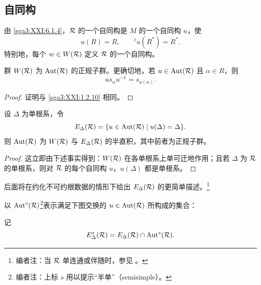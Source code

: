 \subsection{自同构}\label{sga3:XXI:6.7}

由 \ref{sga3:XXI:6.1.4}，\(\mathcal{R}\) 的一个自同构是 \(M\) 的一个自同构 \(u\)，使
\[
 u(R)=R,
 \qquad
 {}^tu(R^\ast)=R^\ast.
\]
特别地，每个 \(w\in W(\mathcal{R})\) 定义 \(\mathcal{R}\) 的一个自同构。

\begin{lemma}\label{sga3:XXI:6.7.1}
群 \(W(\mathcal{R})\) 为 \(\operatorname{Aut}(\mathcal{R})\) 的正规子群。更确切地，若 \(u\in\operatorname{Aut}(\mathcal{R})\) 且 \(\alpha\in R\)，则
\[
 us_\alpha u^{-1}=s_{u(\alpha)}.
\]
\end{lemma}

\begin{proof}
证明与 \ref{sga3:XXI:1.2.10} 相同。
\end{proof}

\begin{proposition}\label{sga3:XXI:6.7.2}
设 \(\Delta\) 为单根系，令
\[
 E_\Delta(\mathcal{R})=
 \{u\in\operatorname{Aut}(\mathcal{R})\mid u(\Delta)=\Delta\}.
\]
则 \(\operatorname{Aut}(\mathcal{R})\) 为 \(W(\mathcal{R})\) 与 \(E_\Delta(\mathcal{R})\) 的半直积，其中前者为正规子群。
\end{proposition}

\begin{proof}
这立即由下述事实得到：\(W(\mathcal{R})\) 在各单根系上单可迁地作用；且若 \(\Delta\) 为 \(\mathcal{R}\) 的单根系，则对 \(\mathcal{R}\) 的每个自同构 \(u\)，\(u(\Delta)\) 都是单根系。
\end{proof}

后面将在约化不可约根数据的情形下给出 \(E_\Delta(\mathcal{R})\) 的更简单描述。\footnote{编者注：当 \(\mathcal{R}\) 单连通或伴随时，参见 。}

\begin{definition}\label{sga3:XXI:6.7.3}
以 \(\operatorname{Aut}^{s}(\mathcal{R})\)\footnote{编者注：上标 \(s\) 用以提示“半单”（semisimple）。}表示满足下图交换的 \(u\in\operatorname{Aut}(\mathcal{R})\) 所构成的集合：
\begin{center}
\end{center}
记
\[
 E_\Delta^{s}(\mathcal{R})
 =E_\Delta(\mathcal{R})\cap\operatorname{Aut}^{s}(\mathcal{R}).
\]
\end{definition}

